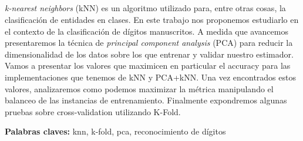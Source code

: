 \begin{addmargin}[5em]{5em}
\section*{\centering \runtitulo}

\noindent \textit{k-nearest neighbors} (kNN) es un algoritmo utilizado para, entre otras cosas, la clasificación de entidades en clases. En este trabajo nos proponemos estudiarlo en el contexto de la clasificación de dígitos manuscritos. A medida que avancemos presentaremos la técnica de \textit{principal component analysis} (PCA) para reducir la dimensionalidad de los datos sobre los que entrenar y validar nuestro estimador. Vamos a presentar los valores que maximicen en particular el accuracy para las implementaciones que tenemos de kNN y PCA+kNN. Una vez encontrados estos valores, analizaremos como podemos maximizar la métrica manipulando el balanceo de las instancias de entrenamiento. Finalmente expondremos algunas pruebas sobre cross-validation utilizando K-Fold.

\bigskip

\noindent\textbf{Palabras claves:} knn, k-fold, pca, reconocimiento de dígitos
\end{addmargin}
